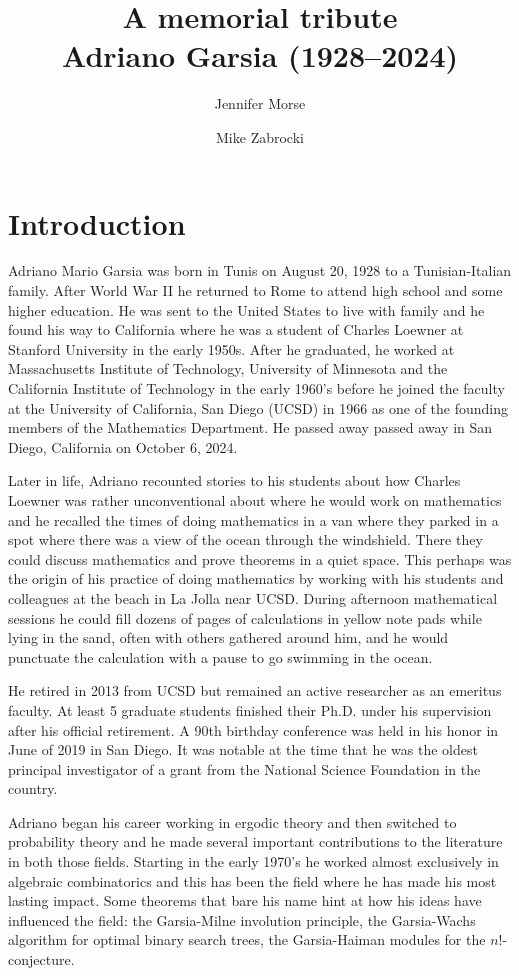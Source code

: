 \documentclass{notices}
\title{
A memorial tribute
\\ Adriano Garsia (1928--2024)
}
\author{
  Jennifer Morse
  \affil{
    The first author is a professor of mathematics at a University of Virginia.
    Her email address is {\tt morsej@virginia.edu}.
    }
  \and
  Mike Zabrocki
  \affil{
    The second author is a professor of mathematics at York University in
    Toronto, Canada.  His email address is {\tt zabrocki@yorku.ca}.
   }
}
\begin{document}
\maketitle

\section*{Introduction}

Adriano Mario Garsia was born in Tunis on August 20, 1928 to a Tunisian-Italian family.  After World War II he returned to Rome to attend high school and some higher education.  He was sent to the United States to live with family and he found his way to California where he was a student of Charles Loewner at Stanford University in the early 1950s.  After he graduated, he worked at Massachusetts Institute of Technology, University of Minnesota and the California Institute of Technology in the early 1960's before he joined the faculty at the University of California, San Diego (UCSD) in 1966 as one of the founding members of the Mathematics Department.  He passed away passed away in San Diego, California on October 6, 2024.

Later in life, Adriano recounted stories to his students about how Charles Loewner was rather unconventional about where he would work on mathematics and he recalled the times of doing mathematics in a van where they parked in a spot where there was a view of the ocean through the windshield.  There they could discuss mathematics and prove theorems in a quiet space.  This perhaps was the origin of his practice of doing mathematics by working with his students and colleagues at the beach in La Jolla near UCSD.  During afternoon mathematical sessions he could fill dozens of pages of calculations in yellow note pads while lying in the sand, often with others gathered around him, and he would punctuate the calculation with a pause to go swimming in the ocean.

He retired in 2013 from UCSD but remained an active researcher as an emeritus faculty.  At least 5 graduate students finished their Ph.D. under his supervision after his official retirement.  A 90th birthday conference was held in his honor in June of 2019 in San Diego.  It was notable at the time that he was the oldest principal investigator of a grant from the National Science Foundation in the country.

Adriano began his career working in ergodic theory and then switched to probability theory and he made several important contributions to the literature in both those fields.  Starting in the early 1970's he worked almost exclusively in algebraic
combinatorics and this has been the field where he has made his most lasting impact.  Some theorems that bare his name hint at how his ideas have influenced the field: the Garsia-Milne involution principle, the Garsia-Wachs algorithm for optimal binary search trees, the Garsia-Haiman modules for the $n!$-conjecture.
\end{document}
